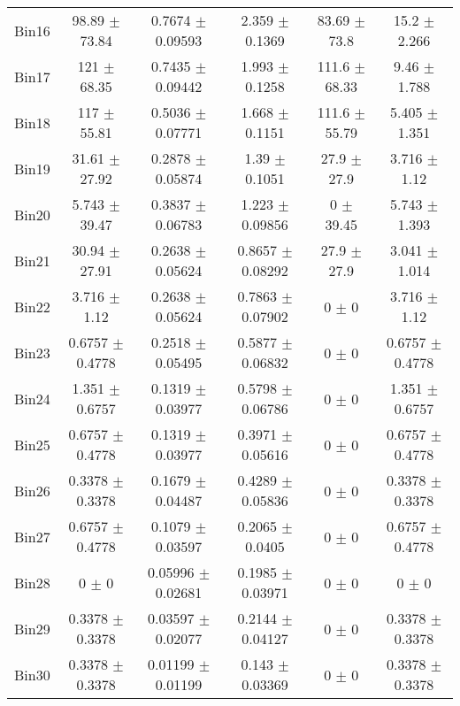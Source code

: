 \begin{tabular}{@{\extracolsep{4pt}}lccccc@{}}
     Bin16 & 98.89 $\pm$ 73.84 & 0.7674 $\pm$ 0.09593 & 2.359 $\pm$ 0.1369 & 83.69 $\pm$ 73.8 & 15.2 $\pm$ 2.266 \\ 
     Bin17 & 121 $\pm$ 68.35 & 0.7435 $\pm$ 0.09442 & 1.993 $\pm$ 0.1258 & 111.6 $\pm$ 68.33 & 9.46 $\pm$ 1.788 \\ 
     Bin18 & 117 $\pm$ 55.81 & 0.5036 $\pm$ 0.07771 & 1.668 $\pm$ 0.1151 & 111.6 $\pm$ 55.79 & 5.405 $\pm$ 1.351 \\ 
     Bin19 & 31.61 $\pm$ 27.92 & 0.2878 $\pm$ 0.05874 & 1.39 $\pm$ 0.1051 & 27.9 $\pm$ 27.9 & 3.716 $\pm$ 1.12 \\ 
     Bin20 & 5.743 $\pm$ 39.47 & 0.3837 $\pm$ 0.06783 & 1.223 $\pm$ 0.09856 & 0 $\pm$ 39.45 & 5.743 $\pm$ 1.393 \\ 
     Bin21 & 30.94 $\pm$ 27.91 & 0.2638 $\pm$ 0.05624 & 0.8657 $\pm$ 0.08292 & 27.9 $\pm$ 27.9 & 3.041 $\pm$ 1.014 \\ 
     Bin22 & 3.716 $\pm$ 1.12 & 0.2638 $\pm$ 0.05624 & 0.7863 $\pm$ 0.07902 & 0 $\pm$ 0 & 3.716 $\pm$ 1.12 \\ 
     Bin23 & 0.6757 $\pm$ 0.4778 & 0.2518 $\pm$ 0.05495 & 0.5877 $\pm$ 0.06832 & 0 $\pm$ 0 & 0.6757 $\pm$ 0.4778 \\ 
     Bin24 & 1.351 $\pm$ 0.6757 & 0.1319 $\pm$ 0.03977 & 0.5798 $\pm$ 0.06786 & 0 $\pm$ 0 & 1.351 $\pm$ 0.6757 \\ 
     Bin25 & 0.6757 $\pm$ 0.4778 & 0.1319 $\pm$ 0.03977 & 0.3971 $\pm$ 0.05616 & 0 $\pm$ 0 & 0.6757 $\pm$ 0.4778 \\ 
     Bin26 & 0.3378 $\pm$ 0.3378 & 0.1679 $\pm$ 0.04487 & 0.4289 $\pm$ 0.05836 & 0 $\pm$ 0 & 0.3378 $\pm$ 0.3378 \\ 
     Bin27 & 0.6757 $\pm$ 0.4778 & 0.1079 $\pm$ 0.03597 & 0.2065 $\pm$ 0.0405 & 0 $\pm$ 0 & 0.6757 $\pm$ 0.4778 \\ 
     Bin28 & 0 $\pm$ 0 & 0.05996 $\pm$ 0.02681 & 0.1985 $\pm$ 0.03971 & 0 $\pm$ 0 & 0 $\pm$ 0 \\ 
     Bin29 & 0.3378 $\pm$ 0.3378 & 0.03597 $\pm$ 0.02077 & 0.2144 $\pm$ 0.04127 & 0 $\pm$ 0 & 0.3378 $\pm$ 0.3378 \\ 
     Bin30 & 0.3378 $\pm$ 0.3378 & 0.01199 $\pm$ 0.01199 & 0.143 $\pm$ 0.03369 & 0 $\pm$ 0 & 0.3378 $\pm$ 0.3378 \\ 
\hline\hline
  \end{tabular}
